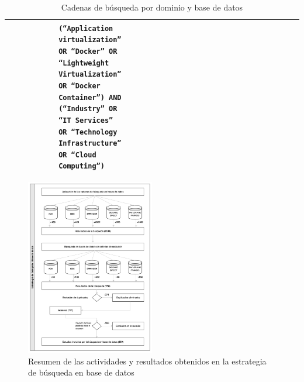 \begin{table}
\begin{adjustbox}{max width=\textwidth}
\begin{tabular}{|P{0.18\linewidth}|P{0.20\linewidth}|P{0.20\linewidth}|P{0.20\linewidth}|P{0.20\linewidth}|P{0.20\linewidth}|}
& \tiny \texttt{(``Application virtualization'' OR ``Docker'' OR ``Lightweight Virtualization'' OR ``Docker Container'') AND (``Industry'' OR ``IT Services'' OR ``Technology Infrastructure'' OR ``Cloud Computing'')} \\
\hline
\end{tabular}
\end{adjustbox}
\caption{Cadenas de búsqueda por dominio y base de datos}\label{tab:cadenas-busqueda}
\end{table}


\begin{figure}[tbp]
    \centering
    \includegraphics[width=0.5\textwidth]{resources/images/busqueda-estudios/busqueda-bd.png}
    \caption{Resumen de las actividades y resultados obtenidos en la estrategia de búsqueda en base de datos}\label{fig:resumen-busqueda-bds}
\end{figure}

